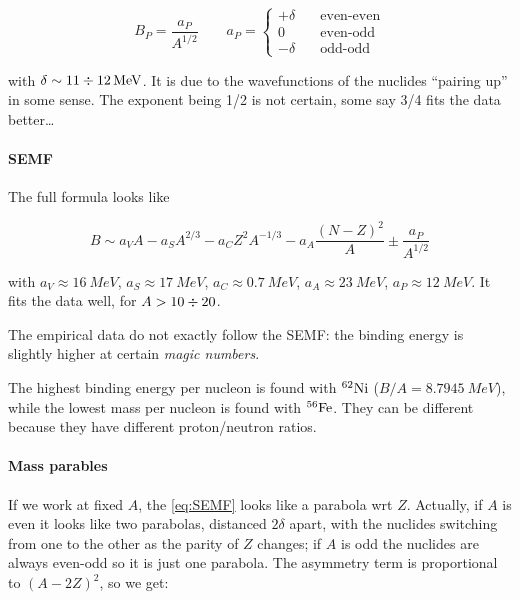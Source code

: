 \documentclass[main.tex]{subfiles}
\begin{document}
\begin{equation}
    B_P = \frac{a_P}{A^{1/2}} \qquad a_P = \begin{cases}
        + \delta \quad &\text{even-even}  \\
        0 \quad &\text{even-odd}  \\
        - \delta \quad &\text{odd-odd}
\end{cases}
\end{equation}

with \(\delta \sim 11 \divisionsymbol \SI{12}{MeV} \). It is due to the wavefunctions of the nuclides ``pairing up'' in some sense. The exponent being 1/2 is not certain, some say 3/4 fits the data better\dots

\paragraph{SEMF}

The full formula looks like

\begin{equation} \label{eq:SEMF}
    B \sim a_V A - a_S A ^{2/3} - a_C Z^2 A ^{-1/3} - a_A \frac{(N-Z)^2}{A} \pm \frac{a_P}{A^{1/2}}
\end{equation}

with \(a_V \approx \SI{16}{MeV} \), \(a_S \approx \SI{17}{MeV} \), \(a_C \approx \SI{0.7}{MeV} \), \(a_A \approx \SI{23}{MeV} \), \(a_P \approx \SI{12}{MeV} \). It fits the data well, for \(A>10 \divisionsymbol 20\).

The empirical data do not exactly follow the SEMF: the binding energy is slightly higher at certain \emph{magic numbers}.

The highest binding energy per nucleon is found with \(^{62} \ce{Ni} \) (\(B/A = \SI{8.7945}{MeV} \)), while the lowest mass per nucleon is found with \(^{56} \ce{Fe} \). They can be different because they have different proton/neutron ratios.

\paragraph{Mass parables}

If we work at fixed \(A\), the \eqref{eq:SEMF} looks like a parabola wrt \(Z\). Actually, if \(A\) is even it looks like two parabolas, distanced \(2\delta\) apart, with the nuclides switching from one to the other as the parity of \(Z\) changes; if \(A\) is odd the nuclides are always even-odd so it is just one parabola. The asymmetry term is proportional to \((A-2Z)^2\), so we get:
\end{document}

